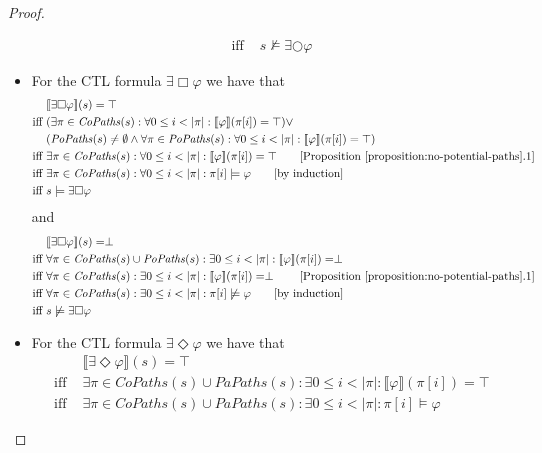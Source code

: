 \documentclass[12pt]{article}
\newcommand{\always}{\Box}
\newcommand{\eventually}{\Diamond}
\newcommand{\nxt}{\bigcirc}
\theoremstyle{definition}
\newcommand{\comment}[1]{\hspace{2em}[\mbox{#1}]}
\newcommand{\satisfaction}[1]{\llbracket #1 \rrbracket}
\newenvironment{franck}{\color{red}}{\color{black}}
\begin{document}
\begin{proof}
\begin{itemize}
\begin{franck}
\begin{align*}
\mbox{iff } & s \not\models \exists \nxt \varphi
\end{align*}
\item
For the CTL formula $\exists \always \varphi$ we have that
\begin{align*}
& \satisfaction{\exists \always \varphi}(s) = \top\\
\mbox{iff } & (\exists \pi \in \mathit{CoPaths}(s) : \forall 0 \leq i < |\pi| : \satisfaction{\varphi}(\pi[i]) = \top) \vee\\
& (\mathit{PoPaths}(s) \not= \emptyset \wedge \forall \pi \in \mathit{PoPaths}(s) : \forall 0 \leq i < |\pi| : \satisfaction{\varphi}(\pi[i]) = \top)\\
\mbox{iff } & \exists \pi \in \mathit{CoPaths}(s) : \forall 0 \leq i < |\pi| : \satisfaction{\varphi}(\pi[i]) = \top
\comment{Proposition~\ref{proposition:no-potential-paths}.1}\\
\mbox{iff } & \exists \pi \in \mathit{CoPaths}(s) : \forall 0 \leq i < |\pi| : \pi[i] \models \varphi
\comment{by induction}\\
\mbox{iff } & s \models \exists \always \varphi
\end{align*}
and
\begin{align*}
& \satisfaction{\exists \always \varphi}(s) = \perp\\
\mbox{iff } & \forall \pi \in \mathit{CoPaths}(s) \cup \mathit{PoPaths}(s) : \exists 0 \leq i < |\pi| : \satisfaction{\varphi}(\pi[i]) = \perp\\
\mbox{iff } & \forall \pi \in \mathit{CoPaths}(s) : \exists 0 \leq i < |\pi| : \satisfaction{\varphi}(\pi[i]) = \perp
\comment{Proposition~\ref{proposition:no-potential-paths}.1}\\
\mbox{iff } & \forall \pi \in \mathit{CoPaths}(s) : \exists 0 \leq i < |\pi| : \pi[i] \not\models \varphi \comment{by induction}\\
\mbox{iff } & s \not\models \exists \always \varphi
\end{align*}
\item
For the CTL formula $\exists \eventually \varphi$ we have that
\begin{align*}
& \satisfaction{\exists \eventually \varphi}(s) = \top\\
\mbox{iff } & \exists \pi \in \mathit{CoPaths}(s) \cup \mathit{PaPaths}(s) : \exists 0 \leq i < |\pi| : \satisfaction{\varphi}(\pi[i]) = \top\\
\mbox{iff } & \exists \pi \in \mathit{CoPaths}(s) \cup \mathit{PaPaths}(s) : \exists 0 \leq i < |\pi| : \pi[i] \models \varphi

\end{align*}
\end{franck}
\end{itemize}
\end{proof}
\end{document}
